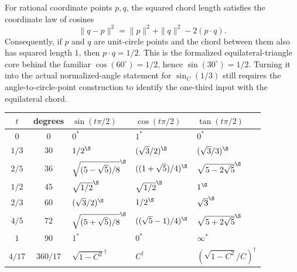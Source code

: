 \begin{theorem}
\label{thm:law-of-cosines-equilateral}
\leanok
For rational coordinate points \(p,q\), the squared chord length satisfies the
coordinate law of cosines
\[
  \|q-p\|^2=\|p\|^2+\|q\|^2-2(p\cdot q).
\]
Consequently, if \(p\) and \(q\) are unit-circle points and the chord between
them also has squared length \(1\), then \(p\cdot q=1/2\).  This is the
formalized equilateral-triangle core behind the familiar
\(\cos(60^\circ)=1/2\), hence \(\sin(30^\circ)=1/2\).  Turning it into the
actual normalized-angle statement for \(\sin_C(1/3)\) still requires the
angle-to-circle-point construction to identify the one-third input with the
equilateral chord.
\end{theorem}

\begin{center}
\small
\begin{tabular}{c c p{}p{}p{}}
\textbf{\(t\)} & \textbf{degrees} &
\textbf{\(\sin(t\pi/2)\)} &
\textbf{\(\cos(t\pi/2)\)} &
\textbf{\(\tan(t\pi/2)\)}\\
\hline
\(0\) & \(0\) &
\(0^{\ast}\) &
\(1^{\ast}\) &
\(0^{\ast}\)\\
\(1/3\) & \(30\) &
\(1/2^{\S}\) &
\((\sqrt3/2)^{\S}\) &
\((\sqrt3/3)^{\S}\)\\
\(2/5\) & \(36\) &
\(\sqrt{(5-\sqrt5)/8}^{\S}\) &
\(((1+\sqrt5)/4)^{\S}\) &
\(\sqrt{5-2\sqrt5}^{\S}\)\\
\(1/2\) & \(45\) &
\(\sqrt{1/2}^{\S}\) &
\(\sqrt{1/2}^{\S}\) &
\(1^{\S}\)\\
\(2/3\) & \(60\) &
\((\sqrt3/2)^{\S}\) &
\(1/2^{\S}\) &
\(\sqrt3^{\S}\)\\
\(4/5\) & \(72\) &
\(\sqrt{(5+\sqrt5)/8}^{\S}\) &
\(((\sqrt5-1)/4)^{\S}\) &
\(\sqrt{5+2\sqrt5}^{\S}\)\\
\(1\) & \(90\) &
\(1^{\ast}\) &
\(0^{\ast}\) &
\(\infty^{\ast}\)\\
\(4/17\) & \(360/17\) &
\(\sqrt{1-C^2}^{\dagger}\) &
\(C^{\dagger}\) &
\((\sqrt{1-C^2}/C)^{\dagger}\)\\
\end{tabular}
\end{center}


